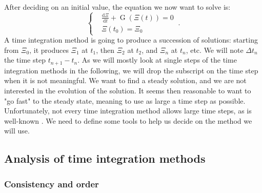     \paragraph{}
    After deciding on an initial value, the equation we now want to solve is:
    \begin{equation}\label{eq:init_value_ode}
      \left\{\begin{aligned}
        & \frac{\mathrm{d} \Xi}{\mathrm{d}t} + \operatorname{G}\left(\Xi\left(t\right)\right) = 0 \\
        & \Xi\left(t_0\right) = \Xi_0
      \end{aligned}\right. \ .
    \end{equation}
    A time integration method is going to produce a succession of solutions: starting from $\Xi_0$, it produces $\Xi_1$ at $t_1$, then $\Xi_2$ at $t_2$, and $\Xi_n$ at $t_n$, etc.
    We will note $\Delta t_n$ the time step $t_{n+1} - t_n$.
    As we will mostly look at single steps of the time integration methods in the following, we will drop the subscript on the time step when it is not meaningful.
    We want to find a steady solution, and we are not interested in the evolution of the solution.
    It seems then reasonable to want to "go fast" to the steady state, meaning to use as large a time step as possible.
    Unfortunately, not every time integration method allows large time steps, as is well-known \cite{CourantFriedrichsLewy1967}.
    We need to define some tools to help us decide on the method we will use.


    \subsection{Analysis of time integration methods}

      \subsubsection{Consistency and order}

